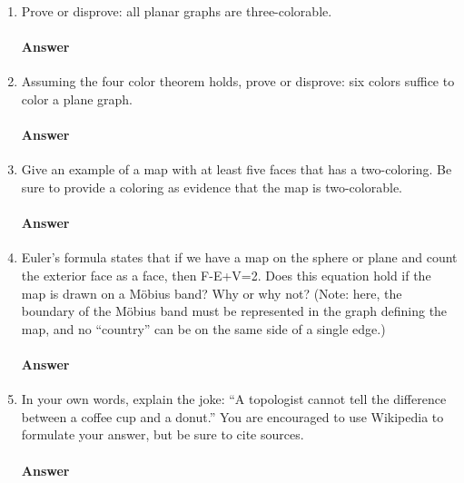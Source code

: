 \documentclass{article}
\begin{document}
\begin{enumerate}
    \item Prove or disprove: all planar graphs are three-colorable.

        \paragraph{Answer}
        \todo{}

    \item Assuming the four color theorem holds, prove or disprove: six colors
        suffice to color a plane graph.

        \paragraph{Answer}
        \todo{}

    \item Give an example of a map with at least five faces that has a
        two-coloring.  Be sure to provide a coloring as evidence that the map is
        two-colorable.

        \paragraph{Answer}

    \item Euler's formula states that if we have a map on the sphere or plane
        and count the exterior face as a face, then F-E+V=2.  Does this equation
        hold if the map is drawn on a M\"obius band? Why or why not? (Note:
        here, the boundary of the M\"obius band must be represented in the graph
        defining the map, and no ``country'' can be on the same side of a single
        edge.)

        \paragraph{Answer}

    \item In your own words, explain the joke: ``A topologist cannot tell the
        difference between a coffee cup and a donut.''  You are encouraged to
        use Wikipedia to formulate your answer, but be sure to cite sources.

        \paragraph{Answer}

\end{enumerate}
\end{document}

